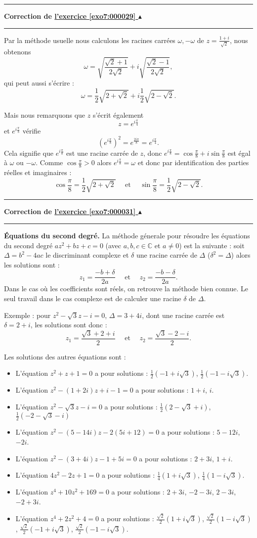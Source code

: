\documentclass[11pt,a4paper]{article}
\newcommand{\Cc}{\mathbb{C}} \newcommand{\C}{\mathbb{C}}
\newcounter{exo}
\newcommand{\correction}[1]{\hypertarget{cor7:#1}{}\label{cor7:#1}{\bf Correction de \hyperlink{exo7:#1}{l'exercice \ref{exo7:#1} $\blacktriangle$}}\vspace{1mm}\hrule\vspace{1mm}}
\newcommand{\fincorrection}{\vspace{1mm}\hrule\vspace*{7mm}}
\begin{document}
\fincorrection
\correction{000029}
Par la m\'ethode usuelle nous calculons les racines carr\'ees
$\omega, -\omega$ de $z = \frac{1+i}{\sqrt{2}}$, nous obtenons
$$\omega = \sqrt{\frac{\sqrt{2}+1}{2\sqrt{2}}}+i\sqrt{\frac{\sqrt{2}-1}{2\sqrt{2}}},$$
qui peut aussi s'écrire :
$$\omega = \frac 12 \sqrt{2+\sqrt 2} +i \frac 12 \sqrt{2-\sqrt 2}.$$

Mais nous remarquons que $z$ s'\'ecrit \'egalement
$$z = e^{i\frac{\pi}{4}}$$
et  $e^{i\frac{\pi}{8}}$ v\'erifie
$$\left (e^{i\frac{\pi}{8}}\right)^2 = e^{\frac{2i\pi}{8}}
= e^{i\frac{\pi}{4}}.$$
 Cela signifie que $e^{i\frac{\pi}{8}}$ est
une racine carr\'ee de $z$, donc $ e^{i\frac{\pi}{8}} = \cos
\frac{\pi}{8}+i\sin\frac{\pi}{8}$
  est \'egal \`a  $\omega$ ou $-\omega$. Comme $ \cos \frac{\pi}{8} > 0$
alors $ e^{i\frac{\pi}{8}} =  \omega$ et donc par identification
des parties r\'eelles et imaginaires :
$$\cos \frac{\pi}{8} = \frac 12 \sqrt{2+\sqrt 2}
\quad \text{ et }\quad \sin \frac{\pi}{8} =
\frac 12 \sqrt{2-\sqrt 2}.$$
\fincorrection
\correction{000031}
\textbf{\'Equations du second degr\'e.} La m\'ethode g\'enerale
pour r\'esoudre les \'equations du second degr\'e $az^2+bz+c= 0$
(avec $a,b,c \in \Cc$ et $a\not=0$) est la suivante : soit $\Delta
= b^2-4ac$ le discriminant complexe et $\delta$ une racine
carr\'ee de $\Delta$ ($\delta^2 = \Delta$) alors les solutions
sont :
$$z_1 = \frac{-b+\delta}{2a} \quad \text{ et } \quad z_2 = \frac{-b-\delta}{2a}.$$
Dans le cas o\`u les coefficients sont r\'eels, on retrouve la
m\'ethode bien connue. Le seul travail dans le cas complexe est de
calculer une racine $\delta$ de $\Delta$.

Exemple : pour $z^2-\sqrt{3}z-i =0$, $\Delta = 3+4i$, dont une
racine carr\'ee est $\delta = 2+i$,  les solutions sont donc :
$$z_1 = \frac{\sqrt{3}+2+i}{2}\quad  \text{ et }\quad  z_2 = \frac{\sqrt{3}-2-i}{2}.$$

Les solutions des autres équations sont :
\begin{itemize}
 \item L'équation $z^2+z+1=0$ a pour solutions : $\frac12 (-1+i\sqrt{3})$, $\frac12 (-1-i\sqrt{3})$.
 \item L'équation $z^2-(1+2i)z+i-1=0$ a pour solutions : $1+i$, $i$.
 \item L'équation $z^2-\sqrt{3}z-i=0$ a pour solutions : $\frac12(2-\sqrt{3}+i)$,  $\frac12(-2-\sqrt{3}-i)$
 \item L'équation $z^2-(5-14i)z-2(5i+12)=0$ a pour solutions : $5-12i$, $-2i$.
 \item L'équation $z^2-(3+4i)z-1+5i =0$ a pour solutions : $2+3i$, $1+i$.
 \item L'équation $4z^2-2z+1=0$ a pour solutions : $\frac 14(1+i\sqrt{3})$, $\frac 14(1-i\sqrt{3})$.
 \item L'équation $z^4+10z^2 +169=0$ a pour solutions : $2+3i$, $-2-3i$, $2-3i$, $-2+3i$.
 \item L'équation $z^4+2z^2 +4=0$ a pour solutions : $\frac{\sqrt{2}}{2}(1+i\sqrt{3})$, $\frac{\sqrt{2}}{2}(1-i\sqrt{3})$,  $\frac{\sqrt{2}}{2}(-1+i\sqrt{3})$, $\frac{\sqrt{2}}{2}(-1-i\sqrt{3})$.
\end{itemize}
\end{document}
